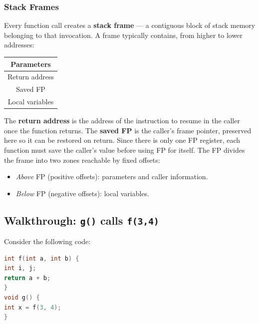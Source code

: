 \subsubsection{Stack Frames}
Every function call creates a \textbf{stack frame} — a contiguous block of stack memory belonging to that invocation. A frame typically contains, from higher to lower addresses:
\begin{center}
\begin{tabular}{|c|}
\hline
Parameters \\
\hline
Return address \\
\hline
Saved FP \\
\hline
Local variables \\
\hline
\end{tabular}
\end{center}
The \textbf{return address} is the address of the instruction to resume in the caller once the function returns. The \textbf{saved FP} is the caller's frame pointer, preserved here so it can be restored on return. Since there is only one FP register, each function must save the caller's value before using FP for itself.
The FP divides the frame into two zones reachable by fixed offsets:
\begin{itemize}
\item \emph{Above} FP (positive offsets): parameters and caller information.
\item \emph{Below} FP (negative offsets): local variables.
\end{itemize}

\subsection{Walkthrough: \texttt{g()} calls \texttt{f(3,4)}}
Consider the following code:
\begin{lstlisting}[language=C]
int f(int a, int b) {
int i, j;
return a + b;
}
void g() {
int x = f(3, 4);
}
\end{lstlisting}
